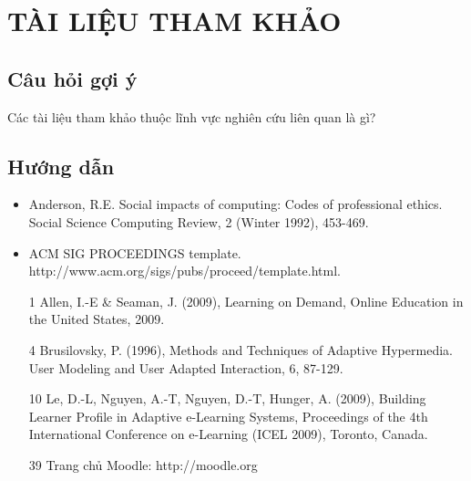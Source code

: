 \section*{TÀI LIỆU THAM KHẢO}
\subsection*{Câu hỏi gợi ý}
Các tài liệu tham khảo thuộc lĩnh vực nghiên cứu liên quan là gì?
\subsection*{Hướng dẫn}
\begin{itemize}
    \item Anderson, R.E. Social impacts of computing: Codes of professional ethics. Social Science Computing Review, 2 (Winter 1992), 453-469.
    \item ACM SIG PROCEEDINGS template. http://www.acm.org/sigs/pubs/proceed/template.html.
    \item [1] Allen, I.-E \& Seaman, J. (2009), Learning on Demand, Online Education in the United States, 2009.
    \item [4] Brusilovsky, P. (1996), Methods and Techniques of Adaptive Hypermedia. User Modeling and User Adapted Interaction, 6, 87-129.
    \item [10] Le, D.-L, Nguyen, A.-T, Nguyen, D.-T, Hunger, A. (2009), Building Learner Profile in Adaptive e-Learning Systems, Proceedings of the 4th International Conference on e-Learning (ICEL 2009), Toronto, Canada.
    \item [39] Trang chủ Moodle: http://moodle.org
\end{itemize}
